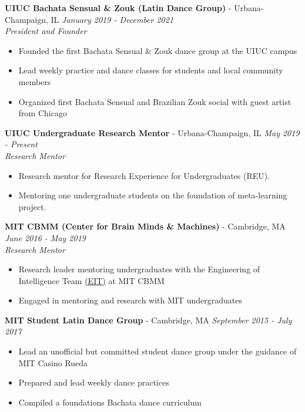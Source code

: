 \documentclass{article}
\newenvironment{changemargin}[2]{%
  \begin{list}{}{%
    \setlength{\topsep}{0pt}%
    \setlength{\leftmargin}{#1}%
    \setlength{\rightmargin}{#2}%
    \setlength{\listparindent}{\parindent}%
    \setlength{\itemindent}{\parindent}%
    \setlength{\parsep}{\parskip}%
  }%
  \item[]}{\end{list}
}
\newenvironment{body} {
	\vspace*{-16pt}
	\begin{changemargin}{-0.25in}{-0.5in}
  }	
	{\end{changemargin}
}
\begin{document}
\begin{body}
	\textbf{UIUC Bachata Sensual \& Zouk (Latin Dance Group)} - Urbana-Champaign, IL \hfill \emph{January 2019 - December 2021}\\
	\emph{President and Founder}\\
	\vspace*{-3pt}
	\begin{itemize} \itemsep -2pt  %
    	\item Founded the first Bachata Sensual \& Zouk dance group at the UIUC campus
    	\item Lead weekly practice and dance classes for students and local community members
    	\item Organized first Bachata Sensual and Brazilian Zouk social with guest artist from Chicago
	\end{itemize}
	\vspace{5 pt}
	
	\textbf{UIUC Undergraduate Research Mentor} - Urbana-Champaign, IL \hfill \emph{May 2019 - Present}\\
	\emph{Research Mentor}\\
	\vspace*{-3pt}
	\begin{itemize} \itemsep -2pt  %
    	\item Research mentor for Research Experience for Undergraduates (REU).
    	\item Mentoring one undergraduate students on the foundation of meta-learning project.
	\end{itemize}
	\vspace{5 pt}
	
	\textbf{MIT CBMM (Center for Brain Minds \& Machines)} - Cambridge, MA \hfill \emph{June 2016 - May 2019}\\
	\emph{Research Mentor}\\
	\vspace*{-3pt}
	\begin{itemize} \itemsep -2pt  %
    	\item Research leader mentoring undergraduates with the Engineering of Intelligence Team \href{https://cbmm.mit.edu/eit/people}{(EIT)} at MIT CBMM
        \item Engaged in mentoring and research with MIT undergraduates
	\end{itemize}
	\vspace{5 pt}
	
	\textbf{MIT Student Latin Dance Group} - Cambridge, MA \hfill \emph{September 2015 - July 2017}\\
	\vspace*{-3pt}
	\begin{itemize} \itemsep -2pt
		\item Lead an unofficial but committed student dance group under the guidance of MIT Casino Rueda
        \item Prepared and lead weekly dance practices
        \item Compiled a foundations Bachata dance curriculum
	\end{itemize}
	\vspace{5 pt}
	

\end{body}
\end{document}
